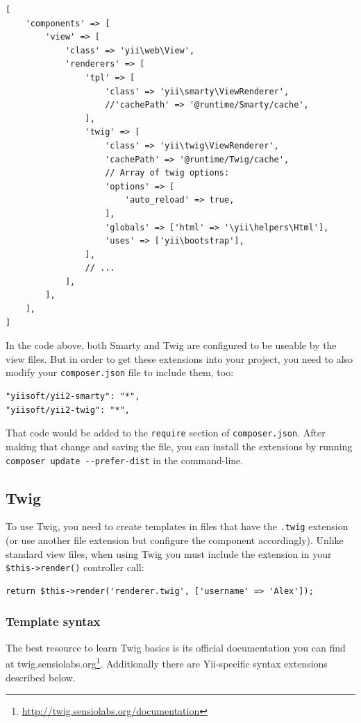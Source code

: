 \lstset{language=php}\begin{lstlisting}
[
    'components' => [
        'view' => [
            'class' => 'yii\web\View',
            'renderers' => [
                'tpl' => [
                    'class' => 'yii\smarty\ViewRenderer',
                    //'cachePath' => '@runtime/Smarty/cache',
                ],
                'twig' => [
                    'class' => 'yii\twig\ViewRenderer',
                    'cachePath' => '@runtime/Twig/cache',
                    // Array of twig options:
                    'options' => [
                        'auto_reload' => true,
                    ],
                    'globals' => ['html' => '\yii\helpers\Html'],
                    'uses' => ['yii\bootstrap'],
                ],
                // ...
            ],
        ],
    ],
]
\end{lstlisting}
In the code above, both Smarty and Twig are configured to be useable by the view files. But in order to get these extensions into your project, you need to also modify
your \lstinline|composer.json| file to include them, too:

\begin{lstlisting}
"yiisoft/yii2-smarty": "*",
"yiisoft/yii2-twig": "*",
\end{lstlisting}
That code would be added to the \lstinline|require| section of \lstinline|composer.json|. After making that change and saving the file, you can install the extensions by running \lstinline|composer update --prefer-dist| in the command-line.

\subsection{Twig}
To use Twig, you need to create templates in files that have the \lstinline|.twig| extension (or use another file extension but
configure the component accordingly). Unlike standard view files, when using Twig you must include the extension
in your \lstinline|$this->render()| controller call:

\lstset{language=php}\begin{lstlisting}
return $this->render('renderer.twig', ['username' => 'Alex']);
\end{lstlisting}
\subsubsection{Template syntax}
The best resource to learn Twig basics is its official documentation you can find at
twig.sensiolabs.org\footnote{\url{http://twig.sensiolabs.org/documentation}}. Additionally there are Yii-specific syntax extensions
described below.

